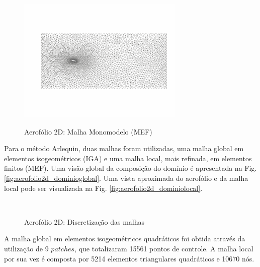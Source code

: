 \documentclass[tese_patricia]{subfiles}
\begin{document}
\begin{figure}[htb!]
	\centering 
	{\includegraphics[scale=2.5,trim=0cm 0.9cm 0cm 0.8cm, clip=true]{Imagens/Cap6/malhaMonoEstatica.pdf}}	
	\caption{Aerofólio 2D: Malha Monomodelo (MEF) }
	\label{fig:aerofolio2d_malhamonomodelomef}
\end{figure}


Para o método Arlequin, duas malhas foram utilizadas, uma malha global em elementos isogeométricos (IGA) e uma malha local, mais refinada, em elementos finitos (MEF). Uma visão global da composição do domínio é apresentada na Fig. \ref{fig:aerofolio2d_dominioglobal}. Uma vista aproximada do aerofólio e da malha local pode ser visualizada na Fig. \ref{fig:aerofolio2d_dominiolocal}.

\begin{figure}[!htb]
	\centering
	\\
	\caption{Aerofólio 2D: Discretização das malhas}
	\label{fig:aerofolio2d_malhasepatches}
\end{figure}

A malha global em elementos isogeométricos quadráticos foi obtida através da utilização de 9 $patches$, que totalizaram 15561 pontos de controle. A malha local por sua vez é composta por 5214 elementos triangulares quadráticos e 10670 nós. 
\end{document}
